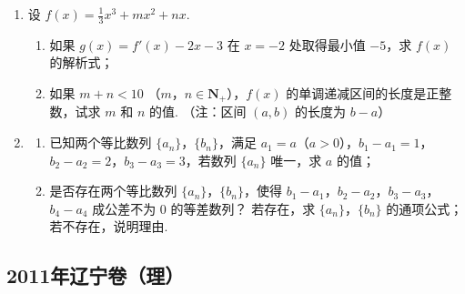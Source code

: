 \begin{description}
\begin{enumerate}[leftmargin=5pt]
        \item 设 \( f(x) = \frac{1}{3} x^3 + mx^2 + nx \).
\begin{enumerate}
\item 如果 \( g(x) = f'(x) - 2x - 3 \) 在 \( x = -2 \) 处取得最小值 \(-5\)，求 \( f(x) \) 的解析式；
\item 如果 \(m + n < 10\) （\(m\)，\(n \in \mathbf{N}_+\)），\(f(x)\) 的单调递减区间的长度是正整数，试求 \(m\) 和 \(n\) 的值. （注：区间 \((a, b)\) 的长度为 \(b - a\)）
\end{enumerate}

        \item \begin{enumerate}
\item 已知两个等比数列 \(\{a_{n}\}\)，\(\{b_{n}\}\)，满足 \(a_{1} = a\)（\(a > 0\)），\(b_{1} - a_{1} = 1\)，\(b_{2} - a_{2} = 2\)，\(b_{3} - a_{3} = 3\)，若数列 \(\{a_{n}\}\) 唯一，求 \(a\) 的值；
\item 是否存在两个等比数列 \(\{a_{n}\}\)，\(\{b_{n}\}\)，使得 \(b_{1} - a_{1}\)，\(b_{2} - a_{2}\)，\(b_{3} - a_{3}\)，\(b_{4} - a_{4}\) 成公差不为 0 的等差数列？ 若存在，求 \(\{a_{n}\}\)，\(\{b_{n}\}\) 的通项公式；若不存在，说明理由.
\end{enumerate}

    \end{enumerate}

\end{description}


\subsection{2011年辽宁卷（理）}\label{gk:2011年辽宁卷（理）}

